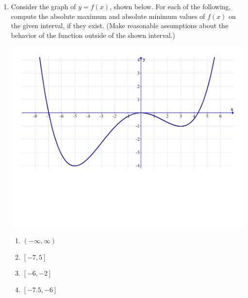 \documentclass[12pt]{article}
\newif\ifans
\begin{document}
\begin{enumerate}

\item  Consider the graph of $y=f(x)$, shown below. For each of the following, compute the absolute maximum and absolute minimum values of $f(x)$ on the given interval, if they exist.  (Make reasonable assumptions about the behavior of the function outside of the shown interval.)

\begin{center}
\includegraphics[scale=0.5]{graph.pdf}
\end{center}

\begin{enumerate}

\item $(-\infty,\infty)$

\ifans{\fbox{No absolute maximum; Absolute minimum of $-4$ when $x=-5$}} \fi

\item $[-7,5]$

\ifans{\fbox{Absolute maximum of 0 when $x=0$; Absolute minimum of $-4$ when $x=-5$}} \fi

\item $[-6,-2]$

\ifans{\fbox{Absolute maximum of $-1$ when $x=-2$; Absolute minimum of $-4$ when $x=-5$}} \fi

\item $[-7.5,-6]$

\ifans{\fbox{Absolute maximum of $3$ when $x=-7.5$; Absolute minimum of $-3$ when $x=6$}} \fi


\end{enumerate}
\end{enumerate}
\end{document}
